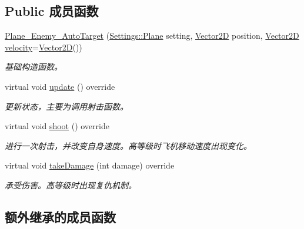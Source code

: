\subsection*{Public 成员函数}
\begin{DoxyCompactItemize}
\item 
\mbox{\label{class_plane___enemy___auto_target_abf4224e6d4c79583016c98dc8747f3ad}} 
\hyperlink{class_plane___enemy___auto_target_abf4224e6d4c79583016c98dc8747f3ad}{Plane\+\_\+\+Enemy\+\_\+\+Auto\+Target} (\hyperlink{struct_settings_1_1_plane}{Settings\+::\+Plane} setting, \hyperlink{structbasic__vector2_d}{Vector2D} position, \hyperlink{structbasic__vector2_d}{Vector2D} \hyperlink{class_entity_a386d25b56772b8913eb3e5adc636f6e0}{velocity}=\hyperlink{structbasic__vector2_d}{Vector2D}())
\begin{DoxyCompactList}\small\item\em 基础构造函数。 \end{DoxyCompactList}\item 
\mbox{\label{class_plane___enemy___auto_target_a79e6eda540d282205ce6151ae0b304ca}} 
virtual void \hyperlink{class_plane___enemy___auto_target_a79e6eda540d282205ce6151ae0b304ca}{update} () override
\begin{DoxyCompactList}\small\item\em 更新状态，主要为调用射击函数。 \end{DoxyCompactList}\item 
virtual void \hyperlink{class_plane___enemy___auto_target_a18e2115af4e2ebb50c920ee9ab2e42ad}{shoot} () override
\begin{DoxyCompactList}\small\item\em 进行一次射击，并改变自身速度。高等级时飞机移动速度出现变化。 \end{DoxyCompactList}\item 
virtual void \hyperlink{class_plane___enemy___auto_target_a1f9400c23995c6ac67fe04309f98cf29}{take\+Damage} (int damage) override
\begin{DoxyCompactList}\small\item\em 承受伤害。高等级时出现复仇机制。 \end{DoxyCompactList}\end{DoxyCompactItemize}
\subsection*{额外继承的成员函数}


